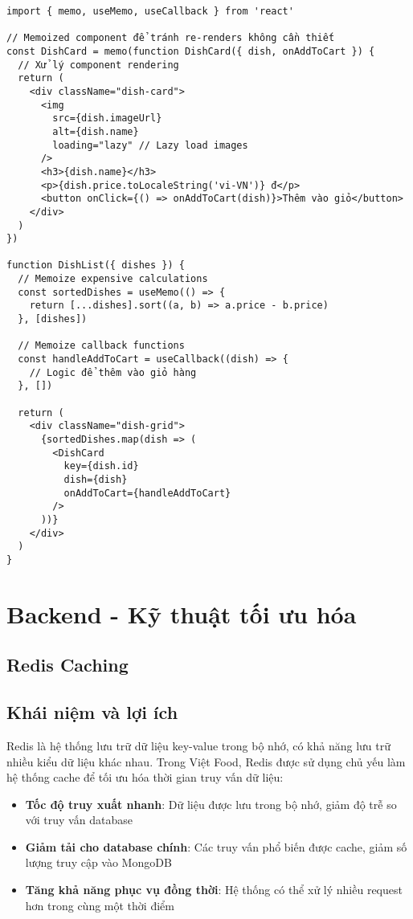 \begin{verbatim}
import { memo, useMemo, useCallback } from 'react'

// Memoized component để tránh re-renders không cần thiết
const DishCard = memo(function DishCard({ dish, onAddToCart }) {
  // Xử lý component rendering
  return (
    <div className="dish-card">
      <img 
        src={dish.imageUrl} 
        alt={dish.name}
        loading="lazy" // Lazy load images
      />
      <h3>{dish.name}</h3>
      <p>{dish.price.toLocaleString('vi-VN')} đ</p>
      <button onClick={() => onAddToCart(dish)}>Thêm vào giỏ</button>
    </div>
  )
})

function DishList({ dishes }) {
  // Memoize expensive calculations
  const sortedDishes = useMemo(() => {
    return [...dishes].sort((a, b) => a.price - b.price)
  }, [dishes])
  
  // Memoize callback functions
  const handleAddToCart = useCallback((dish) => {
    // Logic để thêm vào giỏ hàng
  }, [])
  
  return (
    <div className="dish-grid">
      {sortedDishes.map(dish => (
        <DishCard 
          key={dish.id} 
          dish={dish} 
          onAddToCart={handleAddToCart}
        />
      ))}
    </div>
  )
}
\end{verbatim}

\section{Backend - Kỹ thuật tối ưu hóa}

\subsection{Redis Caching}

\subsection{Khái niệm và lợi ích}
Redis là hệ thống lưu trữ dữ liệu key-value trong bộ nhớ, có khả năng lưu trữ nhiều kiểu dữ liệu khác nhau. Trong Việt Food, Redis được sử dụng chủ yếu làm hệ thống cache để tối ưu hóa thời gian truy vấn dữ liệu:

\begin{itemize}
    \item \textbf{Tốc độ truy xuất nhanh}: Dữ liệu được lưu trong bộ nhớ, giảm độ trễ so với truy vấn database
    \item \textbf{Giảm tải cho database chính}: Các truy vấn phổ biến được cache, giảm số lượng truy cập vào MongoDB
    \item \textbf{Tăng khả năng phục vụ đồng thời}: Hệ thống có thể xử lý nhiều request hơn trong cùng một thời điểm
\end{itemize}


